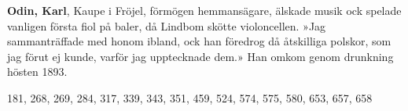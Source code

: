 \textbf{Odin, Karl}, Kaupe i Fröjel, förmögen hemmansägare, älskade musik ock spelade vanligen första fiol på baler, då Lindbom skötte violoncellen. »Jag sammanträffade med honom ibland, ock han föredrog då åtskilliga polskor, som jag förut ej kunde, varför jag upptecknade dem.» Han omkom genom drunkning hösten 1893. 

181, 268, 269, 284, 317, 339, 343, 351, 459, 524, 574, 575, 580, 653, 657, 658 
